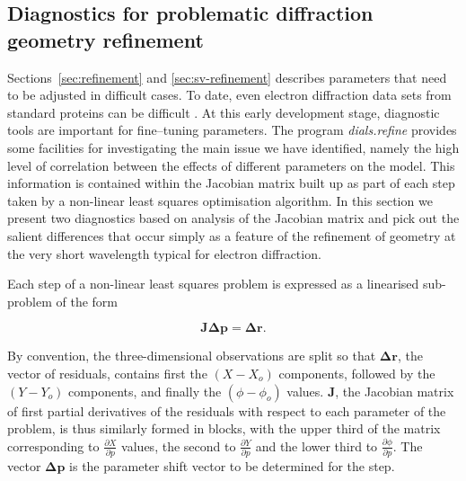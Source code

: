 \documentclass[preprint]{iucr}
\newcommand{\dialsrefine}{\emph{dials.refine}\xspace}
\renewcommand{\vec}[1]{\mathbf{#1}}
\newcommand{\mat}[1]{\mathbf{#1}}
\newcommand{\pder}[2][]{\frac{\partial#1}{\partial#2}}
\begin{document}
\subsection{Diagnostics for problematic diffraction geometry refinement
\label{sec:diag}}

Sections~\ref{sec:refinement} and \ref{sec:sv-refinement} describes parameters that need to be adjusted in
difficult cases. To date, even electron diffraction data sets from standard
proteins can be difficult \cite{Clabbers2017,Hattne2015}. At this early
development stage, diagnostic tools are important for fine--tuning parameters.
The program \dialsrefine provides some facilities for investigating the main
issue we have identified, namely the high level of correlation between the
effects of different parameters on the model. This information is contained
within the Jacobian matrix built up as part of each step taken by a non-linear
least squares optimisation algorithm. In this section we present two
diagnostics based on analysis of the Jacobian matrix and pick out the salient
differences that occur simply as a feature of the refinement of geometry at the
very short wavelength typical for electron diffraction.

Each step of a non-linear least squares problem is expressed as a linearised
sub-problem of the form

\begin{equation}
  \label{eq:linearised_step}
  \mat{J} \vec{\Delta p} = \vec{\Delta r}.
\end{equation}

By convention, the three-dimensional observations are split so that
$\vec{\Delta r}$, the vector of residuals, contains first the $(X - X_o)$
components, followed by the $(Y - Y_o)$ components, and finally the $(\phi -
\phi_o)$ values. $\mat{J}$, the Jacobian matrix of first partial derivatives of
the residuals with respect to each parameter of the problem, is thus similarly
formed in blocks, with the upper third of the matrix corresponding to
$\pder[X]{p}$ values, the second to $\pder[Y]{p}$ and the lower third to
$\pder[\phi]{p}$. The vector $\vec{\Delta p}$ is the parameter shift vector to
be determined for the step.
\end{document}

